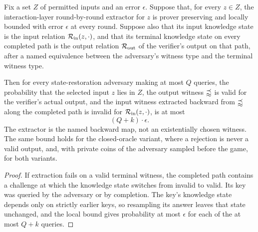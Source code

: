 \begin{theorem}
    \label{thm:sr_knowledge_soundness}
    Fix a set \(Z\) of permitted inputs and an error \(\epsilon\). Suppose that, for every \(z \in Z\),
    the interaction-layer round-by-round extractor for \(z\) is prover preserving and locally bounded with error
    \(\epsilon\) at every round. Suppose also that its input knowledge state is the input relation
    \(\mathcal{R}_{\mathrm{in}}(z, \cdot)\), and that its terminal knowledge state on every completed path is
    the output relation \(\mathcal{R}_{\mathrm{out}}\) of the verifier's output on that path, after a named
    equivalence between the adversary's witness type and the terminal witness type.

    Then for every state-restoration adversary making at most \(Q\) queries, the probability that
    the selected input \(z\) lies in \(Z\), the output witness \(\mathbb{w}\) is valid for the verifier's actual
    output, and the input witness extracted backward from \(\mathbb{w}\) along the completed path is invalid
    for \(\mathcal{R}_{\mathrm{in}}(z, \cdot)\), is at most
    \begin{equation*}
        (Q + k) \cdot \epsilon .
    \end{equation*}
    The extractor is the named backward map, not an existentially chosen witness. The same bound
    holds for the closed-oracle variant, where a rejection is never a valid output, and, with
    private coins of the adversary sampled before the game, for both variants.
    \leanok
\end{theorem}
\begin{proof}
    \leanok
    If extraction fails on a valid terminal witness, the completed path contains a challenge at
    which the knowledge state switches from invalid to valid. Its key was queried by the adversary
    or by completion. The key's knowledge state depends only on strictly earlier keys, so
    resampling its answer leaves that state unchanged, and the local bound gives probability at
    most \(\epsilon\) for each of the at most \(Q + k\) queries.
\end{proof}

